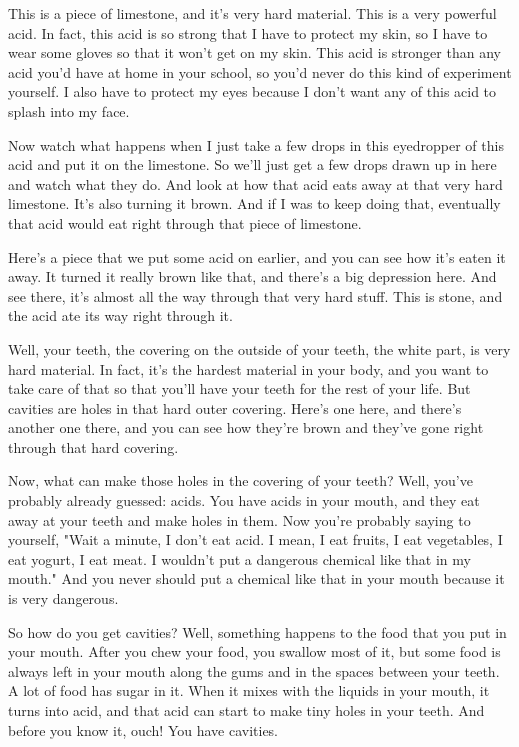 This is a piece of limestone, and it's very hard material. This is a very powerful acid. In fact, this acid is so strong that I have to protect my skin, so I have to wear some gloves so that it won't get on my skin. This acid is stronger than any acid you'd have at home in your school, so you'd never do this kind of experiment yourself. I also have to protect my eyes because I don't want any of this acid to splash into my face.

Now watch what happens when I just take a few drops in this eyedropper of this acid and put it on the limestone. So we'll just get a few drops drawn up in here and watch what they do. And look at how that acid eats away at that very hard limestone. It's also turning it brown. And if I was to keep doing that, eventually that acid would eat right through that piece of limestone.

Here's a piece that we put some acid on earlier, and you can see how it's eaten it away. It turned it really brown like that, and there's a big depression here. And see there, it's almost all the way through that very hard stuff. This is stone, and the acid ate its way right through it.

Well, your teeth, the covering on the outside of your teeth, the white part, is very hard material. In fact, it's the hardest material in your body, and you want to take care of that so that you'll have your teeth for the rest of your life. But cavities are holes in that hard outer covering. Here's one here, and there's another one there, and you can see how they're brown and they've gone right through that hard covering.

Now, what can make those holes in the covering of your teeth? Well, you've probably already guessed: acids. You have acids in your mouth, and they eat away at your teeth and make holes in them. Now you're probably saying to yourself, "Wait a minute, I don't eat acid. I mean, I eat fruits, I eat vegetables, I eat yogurt, I eat meat. I wouldn't put a dangerous chemical like that in my mouth." And you never should put a chemical like that in your mouth because it is very dangerous.

So how do you get cavities? Well, something happens to the food that you put in your mouth. After you chew your food, you swallow most of it, but some food is always left in your mouth along the gums and in the spaces between your teeth. A lot of food has sugar in it. When it mixes with the liquids in your mouth, it turns into acid, and that acid can start to make tiny holes in your teeth. And before you know it, ouch! You have cavities.

